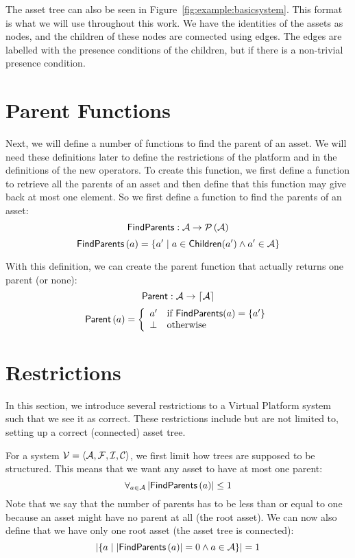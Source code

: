 The asset tree can also be seen in Figure~\ref{fig:example:basicsystem}. This
format is what we will use throughout this work. We have the identities of the
assets as nodes, and the children of these nodes are connected using edges. The edges
are labelled with the presence conditions of the children, but if there is a
non-trivial presence condition.

\section{Parent Functions}\label{sec:vp:parentsfunctions}
Next, we will define a number of functions to find the parent of an asset.
We will need these definitions later to define the restrictions of the platform
and in the definitions of the new operators.
To create this function, we first define a function to retrieve all the parents of an
asset and then define that this function may give back at most one element.
So we first define a function to find the parents of an asset:
\[
  {\sf FindParents} : \mathcal{A} \rightarrow \mathcal{P} \left(\mathcal{A}\right)
\]
\[
  {\sf FindParents} \left( a \right) = \left\{ a' \hspace*{1mm} \middle| \hspace*{1mm} a \in {\sf Children}(a') \land a' \in \mathcal{A} \right\}
\]

With this definition, we can create the parent function that actually returns
one parent (or none):
\[
  {\sf Parent} : \mathcal{A} \rightarrow \lceil \mathcal{A} \rceil
\]
\[
  {\sf Parent}\left( a \right) = 
  \left\{ 
    \begin{array}{ll}
      a' & \text{if } {\sf FindParents}(a) = \left\{ a' \right\} \\
      \bot & \text{otherwise}
    \end{array}
  \right.
\]

\section{Restrictions}\label{sec:vp:restrictions}
In this section, we introduce several restrictions to a Virtual Platform
system such that we see it as correct. These restrictions include but are not
limited to, setting up a correct (connected) asset tree.

For a system \( \mathcal{V} = \left< \mathcal{A} , \mathcal{F} , 
\mathcal{I} , \mathcal{C} \right> \), we first limit how trees are
supposed to be structured. This means that we want any asset to have at most
one parent:
\[
  \forall_{a \in \mathcal{A}} \left| {\sf FindParents}\left( a \right) \right| \leq 1
\]
Note that we say that the number of parents has to be less than or equal to
one because an asset might have no parent at all (the root asset). We can now
also define that we have only one root asset (the asset tree is connected):
\[
  \left| \left\{ a \hspace*{1mm} \middle| \hspace*{1mm} \left| {\sf FindParents}\left( a \right) \right| = 0 \land a \in \mathcal{A} \right\} \right| = 1
\]


